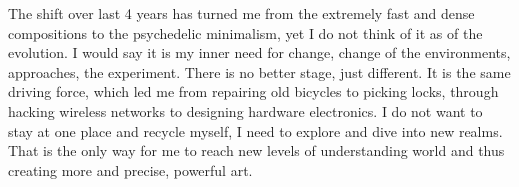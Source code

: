 \documentclass[12pt,a4paper,oneside]{report}
\begin{document}
The shift over last 4 years has turned me from the extremely fast and dense compositions to the psychedelic minimalism, yet I do not think of it as of the evolution. I would say it is my inner need for change, change of the environments, approaches, the experiment. There is no better stage, just different. It is the same driving force, which led me from repairing old bicycles to picking locks, through hacking wireless networks to designing hardware electronics. I do not want to stay at one place and recycle myself, I need to explore and dive into new realms. That is the only way for me to reach new levels of understanding world and thus creating more and precise, powerful art.

\onehalfspacing

\begingroup
\raggedright					%
 

\endgroup

\appendix


\end{document}

